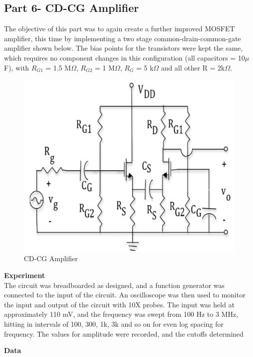 \documentclass[12pt]{article}
\begin{document}
\subsection*{Part 6- CD-CG Amplifier}
The objective of this part was to again create a further improved MOSFET amplifier, this time by implementing a two stage common-drain-common-gate amplifier shown below. The bias points for the transistors were kept the same, which requires no component changes in this configuration (all capacitors = 10$\mu$F), with $R_{G1}$ = 1.5 M$\Omega$, $R_{G2}$ = 1 M$\Omega$, $R_{G}$ = 5 k$\Omega$ and all other R = 2k$\Omega$.
\FloatBarrier
\begin{figure}[h!]
\begin{center}
 \includegraphics[scale=0.23]{./plots/6.png}
\end{center}
\caption{CD-CG Amplifier}
\end{figure}
\FloatBarrier
\textbf{Experiment}\\
The circuit was breadboarded as designed, and a function generator was connected to the input of the circuit. An oscilloscope was then used to monitor the input and output of the circuit with 10X probes. The input was held at approximately 110 mV, and the frequency was swept from 100 Hz to 3 MHz, hitting in intervals of 100, 300, 1k, 3k and so on for even log spacing for frequency. The values for amplitude were recorded, and the cutoffs determined\\\par
\textbf{Data}\\
\end{document}

